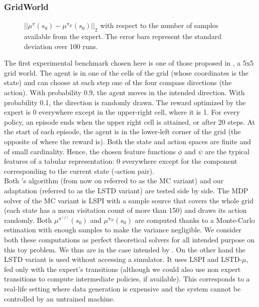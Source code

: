 \documentclass{jfpda2011}
\begin{document}
\subsubsection{GridWorld}
\begin{figure}
\centering
\resizebox{\columnwidth}{!}{}
\caption{$||\mu^{\pi}(s_0) - \mu^{\pi_E}(s_0)||_2$ with respect to the number of samples available from the expert. The error bars represent the standard deviation over 100 runs.}
\label{fig:E}
\end{figure}
The first experimental benchmark chosen here is one of those proposed in \citep{ng2000algorithms}, a 5x5 grid world. The agent is in one of the cells of the grid (whose coordinates is the state) and can choose at each step one of the four compass directions (the action). With probability 0.9, the agent moves in the intended direction. With probability 0.1, the direction is randomly drawn. The reward optimized by the expert is 0 everywhere except in the upper-right cell, where it is 1. For every policy, an episode ends when the upper right cell is attained, or after 20 steps. At the start of each episode, the agent is in the lower-left corner of the grid (the opposite of where the reward is). Both the state and action spaces are finite and of small cardinality. Hence, the chosen feature functions $\phi$ and $\psi$ are the typical features of a tabular representation: 0 everywhere except for the component corresponding to the current state (-action pair).\\

Both \citet{abbeel2004apprenticeship}'s algorithm (from now on referred to as the MC variant) and our adaptation (referred to as the LSTD variant) are tested side by side. The MDP solver of the MC variant is LSPI with a sample source that covers the whole grid (each state has a mean visitation count of more than 150) and draws its action randomly. Both $\mu^{\pi^{(j)}}(s_0)$ and $\mu^{\pi_E}(s_0)$ are computed thanks to a Monte-Carlo estimation with enough samples to make the variance negligible. We consider both these computations as perfect theoretical solvers for all intended purpose on this toy problem. We thus are in the case intended by \citet{abbeel2004apprenticeship}. On the other hand the LSTD variant is used without accessing a simulator. It uses LSPI and LSTD-$\mu$, fed only with the expert's transitions (although we could also use non expert transitions  to compute intermediate policies, if available). This corresponds to a real-life setting where data generation is expensive and the system cannot be controlled by an untrained machine.\\
\end{document}
